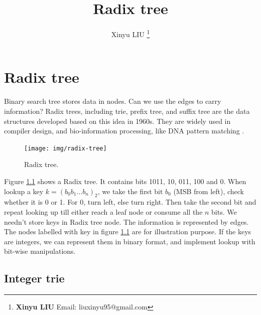 \documentclass[b5paper]{article}
\begin{document}
\title{Radix tree}

\author{Xinyu LIU
\thanks{{\bfseries Xinyu LIU} \newline
  Email: liuxinyu95@gmail.com \newline}
  }

\maketitle
\fi


\ifx\wholebook\relax
\chapter{Radix tree}
\fi

\label{introduction} 

Binary search tree stores data in nodes. Can we use the edges to carry information? Radix trees, including trie, prefix tree, and suffix tree are the data structures developed based on this idea in 1960s. They are widely used in compiler design\cite{okasaki-int-map}, and bio-information processing, like DNA pattern matching \cite{wiki-suffix-tree}.

\begin{figure}[htbp]
  \centering
  \texttt{[image: img/radix-tree]}
  \caption{Radix tree.}
  \label{fig:radix-tree}
\end{figure}

Figure \ref{fig:radix-tree} shows a Radix tree. It contains bits 1011, 10, 011, 100 and 0. When lookup a key $k=(b_0b_1...b_n)_2$, we take the first bit $b_0$ (MSB from left), check whether it is 0 or 1. For 0, turn left, else turn right. Then take the second bit and repeat looking up till either reach a leaf node or consume all the $n$ bits. We needn't store keys in Radix tree node. The information is represented by edges. The nodes labelled with key in figure \ref{fig:radix-tree} are for illustration purpose. If the keys are integers, we can represent them in binary format, and implement lookup with bit-wise manipulations.

\section{Integer trie}
\label{int-trie} 
\end{document}
